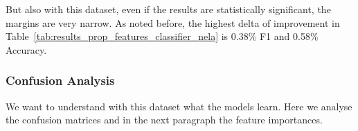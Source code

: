 







 

But also with this dataset, even if the results are statistically significant, the margins are very narrow.
As noted before, the highest delta of improvement in Table~\ref{tab:results_prop_features_classifier_nela} is 0.38\% F1 and 0.58\% Accuracy.

\subsubsection{Confusion Analysis}

We want to understand with this dataset what the models learn. Here we analyse the confusion matrices and in the next paragraph the feature importances.


